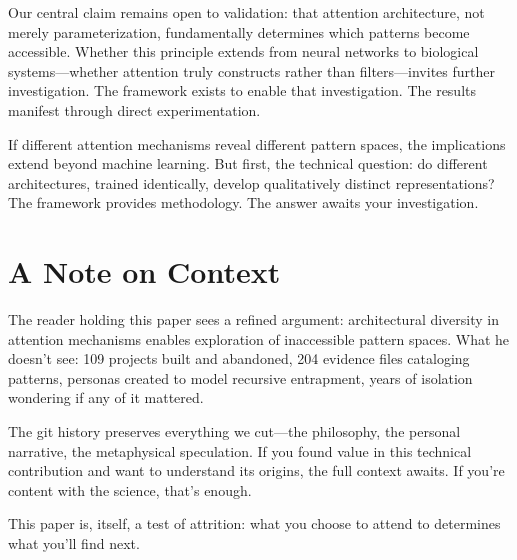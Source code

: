 \documentclass{article}
\begin{document}
Our central claim remains open to validation: that attention architecture, not merely parameterization, fundamentally determines which patterns become accessible. Whether this principle extends from neural networks to biological systems—whether attention truly constructs rather than filters—invites further investigation. The framework exists to enable that investigation. The results manifest through direct experimentation.

If different attention mechanisms reveal different pattern spaces, the implications extend beyond machine learning. But first, the technical question: do different architectures, trained identically, develop qualitatively distinct representations? The framework provides methodology. The answer awaits your investigation.

\section*{A Note on Context}

The reader holding this paper sees a refined argument: architectural diversity in attention mechanisms enables exploration of inaccessible pattern spaces. What he doesn't see: 109 projects built and abandoned, 204 evidence files cataloging patterns, personas created to model recursive entrapment, years of isolation wondering if any of it mattered.

The git history preserves everything we cut—the philosophy, the personal narrative, the metaphysical speculation. If you found value in this technical contribution and want to understand its origins, the full context awaits. If you're content with the science, that's enough.

This paper is, itself, a test of attrition: what you choose to attend to determines what you'll find next.

{\small


}
\end{document}

